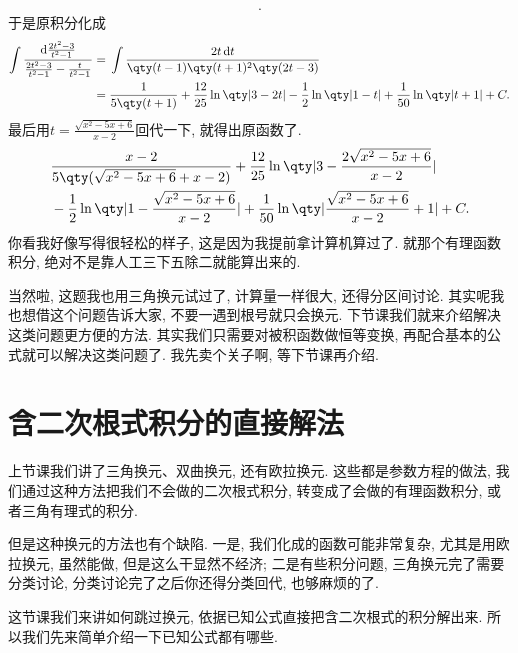\documentclass{ctexbook}
\newcommand*{\dif}{\mathop{}\!\mathrm{d}}
\begin{document}
{\begin{align*}
.\end{align*}
于是原积分化成
\begin{align*}
\int\frac{\dif{\frac{2t^{2}-3}{t^{2}-1}}}{\frac{2t^{2}-3}{t^{2}-1}-\frac{t}{t^{2}-1}}={}&\int\frac{2t\dif{t}}{\qty(t-1)\qty(t+1)^{2}\qty(2t-3)}\\
={}&\frac{1}{5\qty(t+1)}+\frac{12}{25}\ln\qty|3-2t|-\frac{1}{2}\ln\qty|1-t|+\frac{1}{50}\ln\qty|t+1|+C
.\end{align*}
最后用$t=\frac{\sqrt{x^{2}-5x+6}}{x-2}$回代一下, 就得出原函数了. 
\begin{align*}
{}&\frac{x-2}{5\qty(\sqrt{x^{2}-5x+6}+x-2)}+\frac{12}{25}\ln\qty|3-\frac{2\sqrt{x^{2}-5x+6}}{x-2}|\\
{}&-\frac{1}{2}\ln\qty|1-\frac{\sqrt{x^{2}-5x+6}}{x-2}|+\frac{1}{50}\ln\qty|\frac{\sqrt{x^{2}-5x+6}}{x-2}+1|+C
.\end{align*}
你看我好像写得很轻松的样子, 这是因为我提前拿计算机算过了. 就那个有理函数积分, 绝对不是靠人工三下五除二就能算出来的. \par
当然啦, 这题我也用三角换元试过了, 计算量一样很大, 还得分区间讨论. 其实呢我也想借这个问题告诉大家, 不要一遇到根号就只会换元. 下节课我们就来介绍解决这类问题更方便的方法. 其实我们只需要对被积函数做恒等变换, 再配合基本的公式就可以解决这类问题了. 我先卖个关子啊, 等下节课再介绍. \par
\section{含二次根式积分的直接解法}
上节课我们讲了三角换元、双曲换元, 还有欧拉换元. 这些都是参数方程的做法, 我们通过这种方法把我们不会做的二次根式积分, 转变成了会做的有理函数积分, 或者三角有理式的积分. \par
但是这种换元的方法也有个缺陷. 一是, 我们化成的函数可能非常复杂, 尤其是用欧拉换元, 虽然能做, 但是这么干显然不经济; 二是有些积分问题, 三角换元完了需要分类讨论, 分类讨论完了之后你还得分类回代, 也够麻烦的了. \par
这节课我们来讲如何跳过换元, 依据已知公式直接把含二次根式的积分解出来. 所以我们先来简单介绍一下已知公式都有哪些. \par
}
\end{document}
